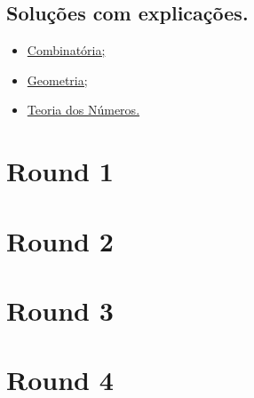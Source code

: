 \documentclass[10pt, a4paper]{article}
\begin{document}
	\subsection{Soluções com explicações.}

	\begin{itemize}
		\item \href{https://static1.squarespace.com/static/570450471d07c094a39efaed/t/58b0dac82e69cf75a401b718/1487985353030/PUMaC2016_CombinatoricsASol.pdf}{Combinatória;}
		\item \href{https://static1.squarespace.com/static/570450471d07c094a39efaed/t/58b0dae6a5790a958b9aacdf/1487985382725/PUMaC2016_GeometryASol.pdf}{Geometria;}
		\item \href{https://static1.squarespace.com/static/570450471d07c094a39efaed/t/58b0db0086e6c04706c33ee1/1487985408927/PUMaC2016_NumberTheoryASol.pdf}{Teoria dos Números.}
	\end{itemize}

	\newpage

	\section{Round 1}	


	\section{Round 2}


	\section{Round 3}


	\section{Round 4}

\end{document}
